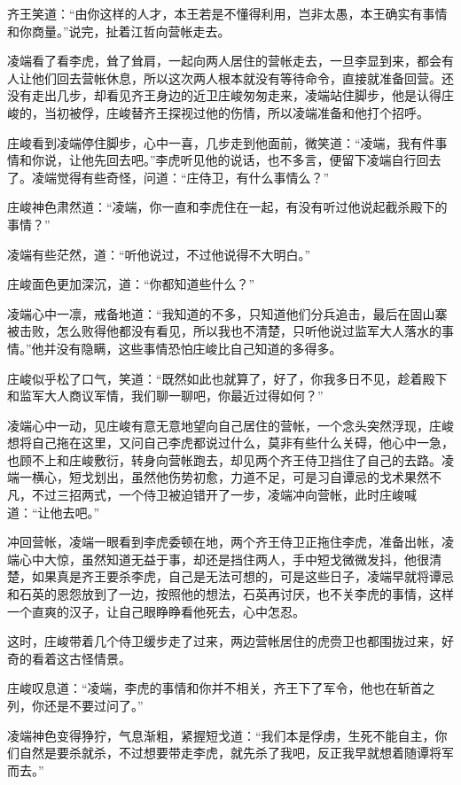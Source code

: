 齐王笑道：“由你这样的人才，本王若是不懂得利用，岂非太愚，本王确实有事情和你商量。”说完，扯着江哲向营帐走去。

凌端看了看李虎，耸了耸肩，一起向两人居住的营帐走去，一旦李显到来，都会有人让他们回去营帐休息，所以这次两人根本就没有等待命令，直接就准备回营。还没有走出几步，却看见齐王身边的近卫庄峻匆匆走来，凌端站住脚步，他是认得庄峻的，当初被俘，庄峻替齐王探视过他的伤情，所以凌端准备和他打个招呼。

庄峻看到凌端停住脚步，心中一喜，几步走到他面前，微笑道：“凌端，我有件事情和你说，让他先回去吧。”李虎听见他的说话，也不多言，便留下凌端自行回去了。凌端觉得有些奇怪，问道：“庄侍卫，有什么事情么？”

庄峻神色肃然道：“凌端，你一直和李虎住在一起，有没有听过他说起截杀殿下的事情？”

凌端有些茫然，道：“听他说过，不过他说得不大明白。”

庄峻面色更加深沉，道：“你都知道些什么？”

凌端心中一凛，戒备地道：“我知道的不多，只知道他们分兵追击，最后在固山寨被击败，怎么败得他都没有看见，所以我也不清楚，只听他说过监军大人落水的事情。”他并没有隐瞒，这些事情恐怕庄峻比自己知道的多得多。

庄峻似乎松了口气，笑道：“既然如此也就算了，好了，你我多日不见，趁着殿下和监军大人商议军情，我们聊一聊吧，你最近过得如何？”

凌端心中一动，见庄峻有意无意地望向自己居住的营帐，一个念头突然浮现，庄峻想将自己拖在这里，又问自己李虎都说过什么，莫非有些什么关碍，他心中一急，也顾不上和庄峻敷衍，转身向营帐跑去，却见两个齐王侍卫挡住了自己的去路。凌端一横心，短戈划出，虽然他伤势初愈，力道不足，可是习自谭忌的戈术果然不凡，不过三招两式，一个侍卫被迫错开了一步，凌端冲向营帐，此时庄峻喊道：“让他去吧。”

冲回营帐，凌端一眼看到李虎委顿在地，两个齐王侍卫正拖住李虎，准备出帐，凌端心中大惊，虽然知道无益于事，却还是挡住两人，手中短戈微微发抖，他很清楚，如果真是齐王要杀李虎，自己是无法可想的，可是这些日子，凌端早就将谭忌和石英的恩怨放到了一边，按照他的想法，石英再讨厌，也不关李虎的事情，这样一个直爽的汉子，让自己眼睁睁看他死去，心中怎忍。

这时，庄峻带着几个侍卫缓步走了过来，两边营帐居住的虎赍卫也都围拢过来，好奇的看着这古怪情景。

庄峻叹息道：“凌端，李虎的事情和你并不相关，齐王下了军令，他也在斩首之列，你还是不要过问了。”

凌端神色变得狰狞，气息渐粗，紧握短戈道：“我们本是俘虏，生死不能自主，你们自然是要杀就杀，不过想要带走李虎，就先杀了我吧，反正我早就想着随谭将军而去。”


